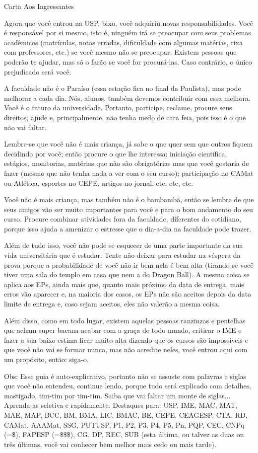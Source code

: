 \begin{secao}{Carta Aos Ingressantes}

Agora que você entrou na USP, bixo, você adquiriu novas responsabilidades.
Você é responsável por si mesmo, isto é, ninguém irá se preocupar com seus
problemas acadêmicos (matrículas, notas erradas, dificuldade com algumas
matérias, rixa com professores, etc.) se você mesmo não se preocupar. Existem
pessoas que poderão te ajudar, mas só o farão se você for procurá-las. Caso
contrário, o único prejudicado será você.

A faculdade não é o Paraíso (essa estação fica no final da Paulista), mas pode
melhorar a cada dia. Nós, alunos, também devemos contribuir com essa melhora.
Você é o futuro da universidade. Portanto, participe, reclame, procure seus
direitos, ajude e, principalmente, não tenha medo de cara feia, pois isso é o
que não vai faltar. 

Lembre-se que você não é mais criança, já sabe o que quer sem que outros fiquem
decidindo por você; então procure o que lhe interessa: iniciação científica,
estágios, monitorias, matérias que não são obrigatórias mas que você gostaria
de fazer (mesmo que não tenha nada a ver com o seu curso); participação no
CAMat ou Atlética, esportes no CEPE, artigos no jornal, etc, etc, etc.

Você não é mais criança, mas também não é o bambambã, então se lembre de que
seus amigos vão ser muito importantes para você e para o bom andamento do seu
curso. Procure combinar atividades fora da faculdade, diferentes do cotidiano,
porque isso ajuda a amenizar o estresse que o dia-a-dia na faculdade pode trazer.

Além de tudo isso, você não pode se esquecer de uma parte importante da sua vida
universitária que é estudar. Tente não deixar para estudar na véspera da prova
porque a probabilidade de você não ir bem nela é bem alta (tirando se você tiver
uma sala do templo em casa que nem a do Dragon Ball). A mesma coisa se aplica aos EPs,
ainda mais que, quanto mais próximo da data de entrega, mais erros vão aparecer
e, na maioria dos casos, os EPs não são aceitos depois da data limite de entrega
e, caso sejam aceitos, eles não valerão a mesma coisa.

Além disso, como em todo lugar, existem aquelas pessoas ranzinzas e pentelhas
que acham super bacana acabar com a graça de todo mundo, criticar o IME e fazer
a sua baixo-estima ficar muito alta dizendo que os cursos são impossíveis e que
você não vai se formar nunca, mas não acredite neles, você entrou aqui com um
propósito, então: siga-o.

Obs: Esse guia é auto-explicativo, portanto não se assuste com palavras e siglas
que você não entendeu, continue lendo, porque tudo será explicado com detalhes,
mastigado, tim-tim por tim-tim. Saiba que vai faltar um monte de siglas...
Aprenda-as seletiva e rapidamente. Destaques para: USP, IME, MAC, MAT, MAE, MAP,
BCC, BM, BMA, LIC, BMAC, BE, CEPE, CEAGESP, CTA, RD, CAMat, AAAMat, SSG, PUTUSP,
P1, P2, P3, P4, P5, Pn, PQP, CEC, CNPq (=\$), FAPESP (=\$\$\$), CG, DP, REC, SUB
(esta última, ou talvez as duas ou três últimas, você vai conhecer bem melhor
mais cedo ou mais tarde).

\end{secao}
